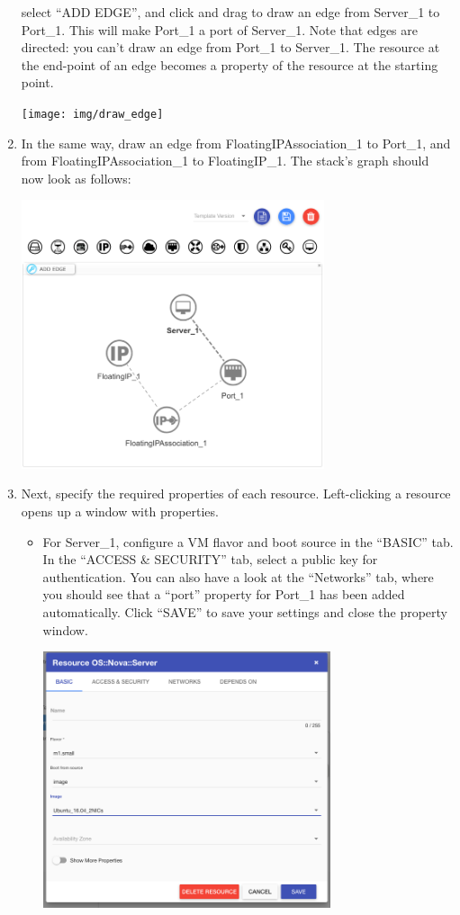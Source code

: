 \begin{enumerate}
  select ``ADD EDGE'', and click and drag to draw an edge from
  Server\_1 to Port\_1.  This will make Port\_1 a port of Server\_1.
  Note that edges are directed: you can't draw an edge from Port\_1 to
  Server\_1.  The resource at the end-point of an edge becomes a
  property of the resource at the starting point.
  \begin{center}
    \texttt{[image: img/draw\_edge]}
  \end{center}
\item In the same way, draw an edge from FloatingIPAssociation\_1 to
  Port\_1, and from FloatingIPAssociation\_1 to FloatingIP\_1.  The
  stack's graph should now look as follows:
  \begin{center}
    \includegraphics[width=0.7\textwidth]{img/all_resources_connected}
  \end{center}
\item Next, specify the required properties of each resource.  Left-clicking a resource opens up a window with properties.
  \begin{itemize}
  \item For Server\_1, configure a VM flavor and boot source in the
    ``BASIC'' tab.  In the ``ACCESS \& SECURITY'' tab, select a public
    key for authentication.  You can also have a look at the
    ``Networks'' tab, where you should see that a ``port'' property
    for Port\_1 has been added automatically.  Click ``SAVE'' to save
    your settings and close the property window.
    \begin{center}
      \includegraphics[width=0.7\textwidth]{img/server_basic_properties}

\end{center}
\end{itemize}
\end{enumerate}
